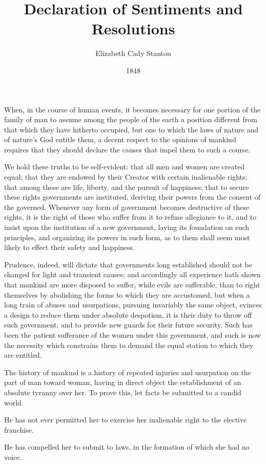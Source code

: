 \documentclass{article}
\title{Declaration of Sentiments and Resolutions}
\author{Elizabeth Cady Stanton}
\date{1848}
\begin{document}
\maketitle

When, in the course of human events, it becomes necessary for one portion of
the family of man to assume among the people of the earth a position different
from that which they have hitherto occupied, but one to which the laws of
nature and of nature's God entitle them, a decent respect to the opinions of
mankind requires that they should declare the causes that impel them to such a
course.

We hold these truths to be self-evident: that all men and women are created
equal; that they are endowed by their Creator with certain inalienable rights;
that among these are life, liberty, and the pursuit of happiness; that to
secure these rights governments are instituted, deriving their powers from the
consent of the governed. Whenever any form of government becomes destructive of
these rights, it is the right of those who suffer from it to refuse allegiance
to it, and to insist upon the institution of a new government, laying its
foundation on such principles, and organizing its powers in such form, as to
them shall seem most likely to effect their safety and happiness.

Prudence, indeed, will dictate that governments long established should not be
changed for light and transient causes; and accordingly all experience hath
shown that mankind are more disposed to suffer, while evils are sufferable,
than to right themselves by abolishing the forms to which they are accustomed,
but when a long train of abuses and usurpations, pursuing invariably the same
object, evinces a design to reduce them under absolute despotism, it is their
duty to throw off such government, and to provide new guards for their future
security. Such has been the patient sufferance of the women under this
government, and such is now the necessity which constrains them to demand the
equal station to which they are entitled.

The history of mankind is a history of repeated injuries and usurpation on the
part of man toward woman, having in direct object the establishment of an
absolute tyranny over her. To prove this, let facts be submitted to a candid
world.

He has not ever permitted her to exercise her inalienable right to the elective
franchise.

He has compelled her to submit to laws, in the formation of which she had no
voice.
\end{document}
